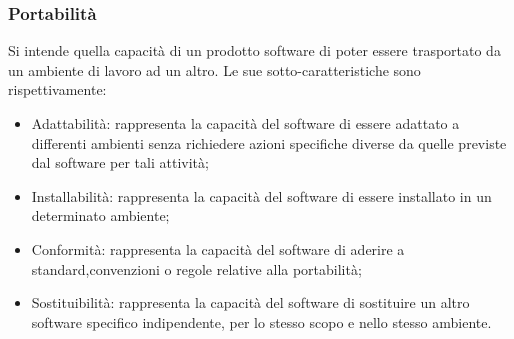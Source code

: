 \subsubsection{Portabilità}
Si intende quella capacità di un prodotto software di poter essere trasportato da un ambiente di lavoro ad un altro. 
Le sue sotto-caratteristiche sono rispettivamente:
\begin{itemize}
\item Adattabilità: rappresenta la capacità del software di essere adattato a differenti ambienti senza richiedere azioni specifiche diverse da quelle previste dal software per tali attività;
\item Installabilità: rappresenta la capacità del software di essere installato in un determinato ambiente;
\item Conformità: rappresenta la capacità del software di aderire a standard,convenzioni o regole relative alla portabilità;
\item Sostituibilità: rappresenta la capacità del software di sostituire un altro software specifico indipendente, per lo stesso scopo e nello stesso ambiente.
\end{itemize}